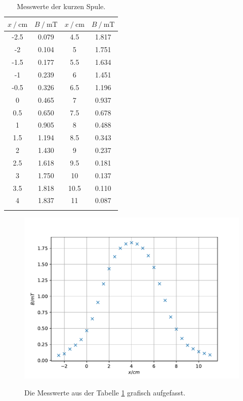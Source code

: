 \begin{table}
\centering
\caption{Messwerte der kurzen Spule.}
\begin{tabular}{cc|cc}
\toprule
$x \:/\: \si{\centi\meter}$ & $B \:/\: \si{\milli\tesla}$ &$x \:/\: \si{\centi\meter}$ & $B \:/\: \si{\milli\tesla}$ \\
\midrule
-2.5 & 0.079 & 4.5 & 1.817  \\
-2 & 0.104 & 5 & 1.751  \\
-1.5 & 0.177 & 5.5 & 1.634  \\
-1 & 0.239 & 6 & 1.451  \\
-0.5 & 0.326 & 6.5 & 1.196  \\
0 & 0.465  & 7 & 0.937  \\
0.5 & 0.650  & 7.5 & 0.678  \\
1 & 0.905  & 8 & 0.488  \\
1.5 & 1.194  &  8.5 & 0.343  \\
2 & 1.430  & 9 & 0.237  \\
2.5 & 1.618  & 9.5 & 0.181  \\
3 & 1.750  & 10 & 0.137 \\
3.5 & 1.818  & 10.5 & 0.110 \\
4 & 1.837  & 11 & 0.087 \\
\bottomrule
\label{tab:short}
\end{tabular}
\end{table}

\begin{figure}
  \centering
  \caption{Die Messwerte aus der Tabelle \ref{tab:short} grafisch aufgefasst.}
  \includegraphics[width=\textwidth]{content/data/plot_short.pdf}
  \label{fig:short}
\end{figure}

